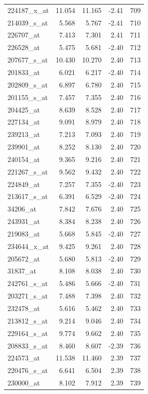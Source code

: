 \begin{footnotesize}
\begin{longtable}{lrrrr}
224187\_x\_at & 11.054 & 11.165 & -2.41 & 709 \\
214039\_s\_at & 5.568 & 5.767 & -2.41 & 710 \\
226707\_at & 7.413 & 7.301 & 2.41 & 711 \\
226528\_at & 5.475 & 5.681 & -2.40 & 712 \\
207677\_s\_at & 10.430 & 10.270 & 2.40 & 713 \\
201833\_at & 6.021 & 6.217 & -2.40 & 714 \\
202809\_s\_at & 6.897 & 6.780 & 2.40 & 715 \\
201155\_s\_at & 7.457 & 7.355 & 2.40 & 716 \\
204425\_at & 8.639 & 8.528 & 2.40 & 717 \\
227134\_at & 9.091 & 8.979 & 2.40 & 718 \\
239213\_at & 7.213 & 7.093 & 2.40 & 719 \\
239901\_at & 8.252 & 8.130 & 2.40 & 720 \\
240154\_at & 9.365 & 9.216 & 2.40 & 721 \\
221267\_s\_at & 9.562 & 9.432 & 2.40 & 722 \\
224849\_at & 7.257 & 7.355 & -2.40 & 723 \\
213617\_s\_at & 6.391 & 6.529 & -2.40 & 724 \\
34206\_at & 7.842 & 7.676 & 2.40 & 725 \\
243931\_at & 8.384 & 8.238 & 2.40 & 726 \\
219083\_at & 5.668 & 5.845 & -2.40 & 727 \\
234644\_x\_at & 9.425 & 9.261 & 2.40 & 728 \\
205672\_at & 5.680 & 5.813 & -2.40 & 729 \\
31837\_at & 8.108 & 8.038 & 2.40 & 730 \\
242761\_s\_at & 5.486 & 5.666 & -2.40 & 731 \\
203271\_s\_at & 7.488 & 7.398 & 2.40 & 732 \\
232478\_at & 5.616 & 5.462 & 2.40 & 733 \\
213812\_s\_at & 9.214 & 9.046 & 2.40 & 734 \\
229164\_s\_at & 9.774 & 9.662 & 2.40 & 735 \\
208833\_s\_at & 8.460 & 8.607 & -2.39 & 736 \\
224573\_at & 11.538 & 11.460 & 2.39 & 737 \\
220476\_s\_at & 6.641 & 6.504 & 2.39 & 738 \\
230000\_at & 8.102 & 7.912 & 2.39 & 739 \\

\end{longtable}
\end{footnotesize}
